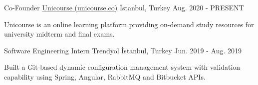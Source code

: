 
\vspace*{-1.5mm}
\begin{cventries}

  \cventry
    {Co-Founder}
    {\href{https://unicourse.co}{Unicourse (unicourse.co)}}
    {İstanbul, Turkey}
    {Aug. 2020 - PRESENT}
    {
      \begin{cvitems}
        \item {Unicourse is an online learning platform providing on-demand study resources for university midterm and final exams.}
      \end{cvitems}
    }

  \cventry
    {Software Engineering Intern}
    {Trendyol}
    {İstanbul, Turkey}
    {Jun. 2019 - Aug. 2019}
    {
      \begin{cvitems}
        \item {Built a Git-based dynamic configuration management system with validation capability using Spring, Angular, RabbitMQ and Bitbucket APIs.}
      \end{cvitems}
    }
\end{cventries}
